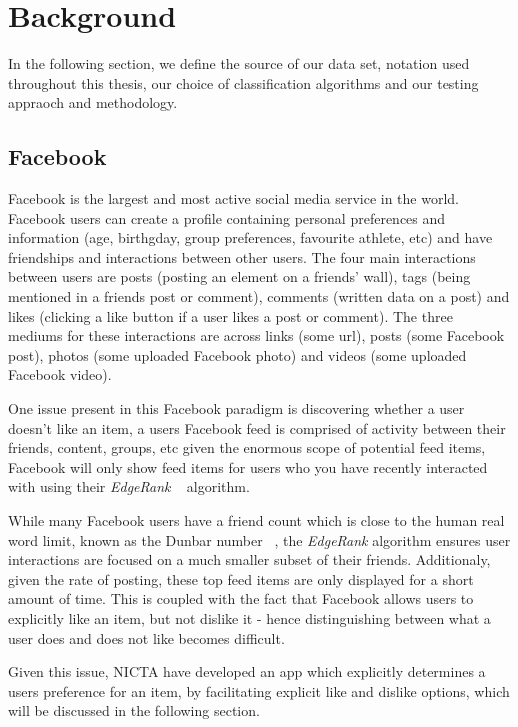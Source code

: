 
\chapter{Background}
\label{cha:back}

In the following section, we define the source of our data set, notation used throughout this thesis, our choice of classification algorithms and 
our testing appraoch and methodology.

\section{Facebook}
\label{sec:data}

Facebook is the largest and most active social media service in the world. Facebook users can create a profile containing personal 
preferences and information (age, birthgday, group preferences, favourite athlete, etc) and have friendships and interactions 
between other users. The four main interactions between users are posts (posting an element on a friends' wall), tags
(being mentioned in a friends post or comment), comments (written data on a post) and likes (clicking a like button if a user 
likes a post or comment). The three mediums for these interactions are across links (some url), posts (some Facebook post), 
photos (some uploaded Facebook photo) and videos (some uploaded Facebook video).

One issue present in this Facebook paradigm is discovering whether a user doesn't like an item, a users Facebook feed is comprised of 
activity between their friends, content, groups, etc given the enormous scope of potential feed items, Facebook will only show feed 
items for users who you have recently interacted with using their \emph{EdgeRank} ~\cite{edge} algorithm. 

While many Facebook users have a friend count which is close to the human real word limit, known as the Dunbar number 
~\cite{hill2003social}, the \emph{EdgeRank} algorithm ensures user interactions are focused on a much smaller subset of their friends.
Additionaly, given the rate of posting, these top feed items are only displayed for a short amount of time. This is coupled 
with the fact that Facebook allows users to explicitly like an item, but not dislike it - hence distinguishing between what 
a user does and does not like becomes difficult.

Given this issue, NICTA have developed an app which explicitly determines a users preference for an item, by facilitating explicit 
like and dislike options, which will be discussed in the following section.

